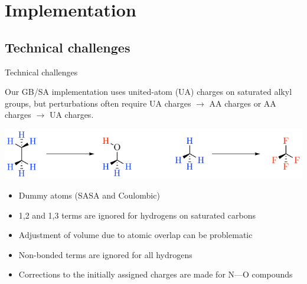 \documentclass[10pt]{beamer}
\begin{document}

\section{Implementation}

\subsection{Technical challenges}


\begin{frame}{Technical challenges}

Our GB/SA implementation uses united-atom (UA) charges on saturated alkyl groups, but perturbations often require
UA charges $\longrightarrow$ AA charges or AA charges $\longrightarrow$ UA charges.

\bigskip
\begin{center}
\includegraphics[scale=0.8]{figures/ua-aa.pdf}
\end{center}
\begin{itemize}
\bigskip

\item Dummy atoms (SASA and Coulombic)
\item 1,2 and 1,3 terms are ignored for hydrogens on saturated carbons
\item Adjustment of volume due to atomic overlap can be problematic
\item Non-bonded terms are ignored for all hydrogens
\item Corrections to the initially assigned charges are made for N---O compounds

\end{itemize}

\end{frame}
\end{document}
